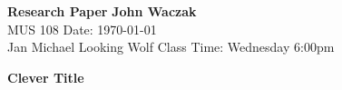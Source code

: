 \documentclass[a4paper, 12pt]{article}
\begin{document}
\noindent
\textbf{Research Paper} \hfill \textbf{John Waczak} \\
 MUS 108 \hfill  Date: \today \\
Jan Michael Looking Wolf \hfill Class Time: Wednesday 6:00pm \\

\begin{center}
  \textbf{Clever Title}
\end{center}
\end{document}
